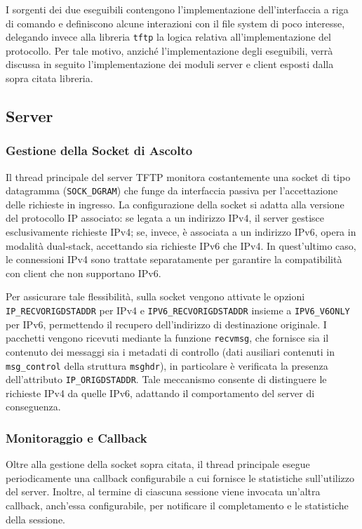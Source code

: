 \documentclass[12pt]{article}
\begin{document}
{I sorgenti dei due eseguibili contengono l'implementazione dell'interfaccia a riga di comando e definiscono alcune interazioni con il file system di poco interesse, delegando invece alla libreria \texttt{tftp} la logica relativa all'implementazione del protocollo.
Per tale motivo, anziché l'implementazione degli eseguibili, verrà discussa in seguito l'implementazione dei moduli server e client esposti dalla sopra citata libreria.

\subsection{Server}

\subsubsection{Gestione della Socket di Ascolto}

Il thread principale del server TFTP monitora costantemente una socket di tipo datagramma (\texttt{SOCK\_DGRAM}) che funge da interfaccia passiva per l'accettazione delle richieste in ingresso. La configurazione della socket si adatta alla versione del protocollo IP associato: se legata a un indirizzo IPv4, il server gestisce esclusivamente richieste IPv4; se, invece, è associata a un indirizzo IPv6, opera in modalità dual-stack, accettando sia richieste IPv6 che IPv4. In quest'ultimo caso, le connessioni IPv4 sono trattate separatamente per garantire la compatibilità con client che non supportano IPv6.

Per assicurare tale flessibilità, sulla socket vengono attivate le opzioni \texttt{IP\_RECVORIGDSTADDR} per IPv4 e \texttt{IPV6\_RECVORIGDSTADDR} insieme a \texttt{IPV6\_V6ONLY} per IPv6, permettendo il recupero dell'indirizzo di destinazione originale. I pacchetti vengono ricevuti mediante la funzione \texttt{recvmsg}, che fornisce sia il contenuto dei messaggi sia i metadati di controllo (dati ausiliari contenuti in \texttt{msg\_control} della struttura \texttt{msghdr}), in particolare è verificata la presenza dell'attributo \texttt{IP\_ORIGDSTADDR}.
Tale meccanismo consente di distinguere le richieste IPv4 da quelle IPv6, adattando il comportamento del server di conseguenza.

\subsubsection{Monitoraggio e Callback}

Oltre alla gestione della socket sopra citata, il thread principale esegue periodicamente una callback configurabile a cui fornisce le statistiche sull'utilizzo del server.
Inoltre, al termine di ciascuna sessione viene invocata un'altra callback, anch'essa configurabile, per notificare il completamento e le statistiche della sessione.

}
\end{document}
